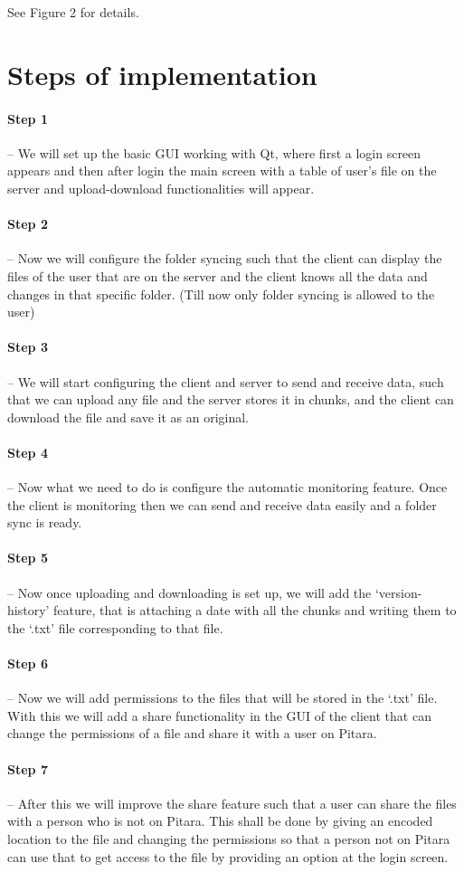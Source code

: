 \documentclass{article}
\begin{document}
	See Figure 2 for details.
	\section{Steps of implementation}\label{soi}
	\paragraph{Step  1}-- We will set up the basic GUI working with Qt, where first a login screen appears and then after login the main screen with a table of user's file on the server and upload-download functionalities will appear.
\paragraph{Step 2}-- Now we will configure the folder syncing such that the client can display the files of the user that are on the server and the client knows all the data and changes in that specific folder. (Till now only folder syncing is allowed to the user)
\paragraph{Step 3}-- We will start configuring the client and server to send and receive data, such that we can upload any file and the server stores it in chunks, and the client can download the file and save it as an original.
\paragraph{Step 4}-- Now what we need to do is configure the automatic monitoring feature. Once the client is monitoring then we can send and receive data easily and a folder sync is ready.
\paragraph{Step 5}-- Now once uploading and downloading is set up, we will add the `version-history' feature, that is attaching a date with all the chunks and writing them to the `.txt' file corresponding to that file.
\paragraph{Step 6}-- Now we will add permissions to the files that will be stored in the `.txt' file. With this we will add a share functionality in the GUI of the client that can change the permissions of a file and share it with a user on Pitara.
\paragraph{Step 7}-- After this we will improve the share feature such that a user can share the files with a person who is not on Pitara. This shall be done by giving an encoded location to the file and changing the permissions so that a person not on Pitara can use that to get access to the file by providing an option at the login screen.
\end{document}
